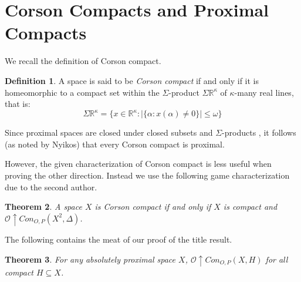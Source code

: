 \documentclass{amsart}
\newtheorem{thm}{Theorem}[section]
\theoremstyle{definition}
\newtheorem{defn}[thm]{Definition}
\theoremstyle{remark}
\newcommand{\<}{\langle}
\renewcommand{\>}{\rangle}
\newcommand{\congame}[2]{Con_{O,P}(#1,#2)}
\newcommand{\pl}[1]{\mathscr{#1}}
\newcommand{\win}{\uparrow}
\newcommand{\term}{\textit}
\begin{document}
\section{Corson Compacts and Proximal Compacts}

We recall  the definition of Corson compact.

\begin{defn}
  A space is said to be \term{Corson compact} if and only if it is homeomorphic to a compact set within the $\Sigma$-product $\Sigma\mathbb{R}^\kappa$ of $\kappa$-many real lines, that is:
    \[
      \Sigma\mathbb{R}^\kappa
        =
      \{x\in \mathbb{R}^\kappa: |\{\alpha:x(\alpha)\not=0\}|\leq\omega\}
    \]
\end{defn}


Since proximal spaces are closed under closed subsets and $\Sigma$-products \cite{b}, it follows (as noted by Nyikos) that every Corson compact is proximal.







However, the given characterization of Corson compact is less useful when proving the other direction.  Instead we use the following game characterization due to the second author.

\begin{thm}\cite{gcovering}
  A space $X$ is Corson compact if and only if $X$ is compact and $\pl O\win\congame{X^2}{\Delta}$.
\end{thm}


The following contains the meat of our proof of the title result.

\begin{thm}
  For any absolutely proximal space $X$, $\pl O\win \congame{X}{H}$ for all compact $H\subseteq X$.
\end{thm}
\end{document}
